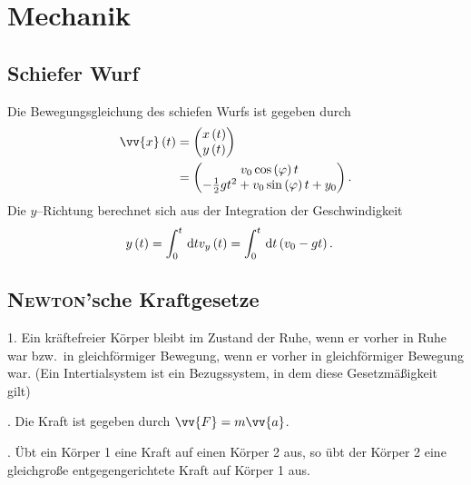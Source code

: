 \newpage
\section{Mechanik}
\subsection{Schiefer Wurf}
Die Bewegungsgleichung des schiefen Wurfs ist gegeben durch
\begin{align} 
        \vv{x}\left(t\right)&=\begin{pmatrix}
                x\left(t\right)\\y\left(t\right)
        \end{pmatrix}\\
                            &=\begin{pmatrix}
                                    v_0\cos \left(\varphi \right)t\\
                                    -\tfrac{1}{2}gt^2+v_0\sin \left(\varphi \right)t+y_0
                            \end{pmatrix}
.\end{align} 
Die $y$--Richtung berechnet sich aus der Integration der Geschwindigkeit
\begin{align} 
        y\left(t\right)&=\int_{0}^{t}\,\text{d} tv_y\left(t\right)=\int_{0}^{t}\,\text{d} t\left(v_0-gt\right)
.\end{align} 

\subsection{\textsc{Newton}'sche Kraftgesetze}
1. Ein kräftefreier Körper bleibt im Zustand der Ruhe, wenn er vorher in Ruhe war bzw.\ in gleichförmiger Bewegung, wenn er vorher in gleichförmiger Bewegung war. (Ein Intertialsystem ist ein Bezugssystem, in dem diese Gesetzmäßigkeit gilt)\par{}. Die Kraft ist gegeben durch $\vv{F}=m\vv{a}$.\par{}. Übt ein Körper 1 eine Kraft auf einen Körper 2 aus, so übt der Körper 2 eine gleichgroße entgegengerichtete Kraft auf Körper 1 aus.

